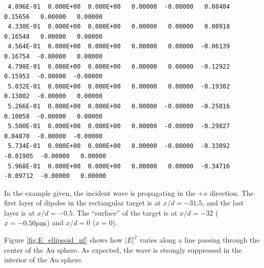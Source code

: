 {\begin{verbatim}
 4.096E-01  0.000E+00  0.000E+00   0.00000  -0.00000   0.08404   0.15656   0.00000   0.00000
 4.330E-01  0.000E+00  0.000E+00   0.00000   0.00000   0.00918   0.16548   0.00000   0.00000
 4.564E-01  0.000E+00  0.000E+00   0.00000   0.00000  -0.06139   0.16754  -0.00000   0.00000
 4.798E-01  0.000E+00  0.000E+00   0.00000   0.00000  -0.12922   0.15953  -0.00000  -0.00000
 5.032E-01  0.000E+00  0.000E+00   0.00000   0.00000  -0.19302   0.13802  -0.00000   0.00000
 5.266E-01  0.000E+00  0.000E+00   0.00000  -0.00000  -0.25016   0.10058  -0.00000   0.00000
 5.500E-01  0.000E+00  0.000E+00   0.00000  -0.00000  -0.29827   0.04870  -0.00000  -0.00000
 5.734E-01  0.000E+00  0.000E+00   0.00000  -0.00000  -0.33092  -0.01905  -0.00000   0.00000
 5.968E-01  0.000E+00  0.000E+00   0.00000   0.00000  -0.34716  -0.09712  -0.00000   0.00000
\end{verbatim}}

In the example given, the incident wave is propagating in the $+x$ direction.
The first layer of dipoles in the rectangular target is at $x/d=-31.5$, and the
last layer is at $x/d=-0.5$.
The ``surface'' of the target is at $x/d=-32$ ($x=-0.50{\mu{\rm m}}$) and
$x/d=0$ ($x=0$).

Figure \ref{fig:E_ellipsoid_nf} shows how $|E|^2$ varies along a line passing
through the center of the Au sphere.
As expected, the wave is strongly suppressed in the interior of the Au sphere.

